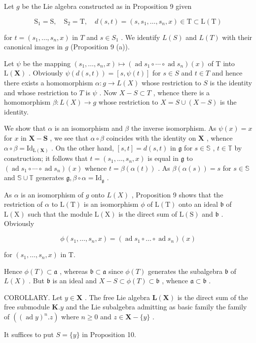 Let \(g\) be the Lie algebra constructed as in Proposition 9 given

\[
\mathrm{S} _ {1} = \mathrm{S}, \quad \mathrm{S} _ {2} = \mathrm{T}, \quad d (s, t) = (s, s _ {1}, \dots , s _ {n}, x) \in \mathrm{T} \subset \mathrm{L} (\mathrm{T})
\]

for \(t = (s_1, \ldots, s_n, x)\) in \(T\) and \(s \in S_1\) . We identify \(L(S)\) and \(L(T)\) with their canonical images in \(g\) (Proposition 9 (a)).

Let \(\psi\) be the mapping \((s_1, \ldots, s_n, x) \mapsto (\operatorname{ad} s_1 \circ \cdots \circ \operatorname{ad} s_n)(x)\) of T into \(\mathrm{L}(\mathbf{X})\) . Obviously \(\psi(d(s, t)) = [s, \psi(t)]\) for \(s \in S\) and \(t \in T\) and hence there exists a homomorphism \(\alpha: g \to L(X)\) whose restriction to \(S\) is the identity and whose restriction to \(T\) is \(\psi\) . Now \(X - S \subset T\) , whence there is a homomorphism \(\beta: L(X) \to g\) whose restriction to \(X = S \cup (X - S)\) is the identity.

We show that \(\alpha\) is an isomorphism and \(\beta\) the inverse isomorphism. As \(\psi(x) = x\) for \(x\) in \(\mathbf{X} - \mathbf{S}\) , we see that \(\alpha \circ \beta\) coincides with the identity on \(\mathbf{X}\) , whence \(\alpha \circ \beta = \mathrm{Id}_{\mathrm{L}(\mathbf{X})}\) . On the other hand, \([s, t] = d(s, t)\) in \(\mathfrak{g}\) for \(s \in \mathbb{S}\) , \(t \in \mathbb{T}\) by construction; it follows that \(t = (s_1, \ldots, s_n, x)\) is equal in \(\mathfrak{g}\) to \((\operatorname{ad} s_1 \circ \cdots \circ \operatorname{ad} s_n)(x)\) whence \(t = \beta(\alpha(t))\) . As \(\beta(\alpha(s)) = s\) for \(s \in \mathbb{S}\) and \(\mathbb{S} \cup \mathbb{T}\) generates \(\mathfrak{g}, \beta \circ \alpha = \mathrm{Id}_{\mathfrak{g}}\) .

As \(\alpha\) is an isomorphism of \(g\) onto \(L(X)\) , Proposition 9 shows that the restriction of \(\alpha\) to \(\mathrm{L(T)}\) is an isomorphism \(\phi\) of \(\mathrm{L(T)}\) onto an ideal \(\mathfrak{b}\) of \(\mathrm{L(X)}\) such that the module \(\mathrm{L(X)}\) is the direct sum of \(\mathrm{L(S)}\) and \(\mathfrak{b}\) . Obviously

\[
\phi (s _ {1}, \dots , s _ {n}, x) = (\operatorname{ad} s _ {1} \circ \dots \circ \operatorname{ad} s _ {n}) (x)
\]

for \((s_1, \ldots, s_n, x)\) in T.

Hence \(\phi(T) \subset \mathfrak{a}\) , whereas \(\mathfrak{b} \subset \mathfrak{a}\) since \(\phi(T)\) generates the subalgebra \(\mathfrak{b}\) of \(L(X)\) . But \(\mathfrak{b}\) is an ideal and \(X - S \subset \phi(T) \subset \mathfrak{b}\) , whence \(\mathfrak{a} \subset \mathfrak{b}\) .

COROLLARY. Let \(y \in \mathbf{X}\) . The free Lie algebra \(\mathbf{L}(\mathbf{X})\) is the direct sum of the free submodule \(\mathbf{K}.y\) and the Lie subalgebra admitting as basic family the family of \(((\operatorname{ad}y)^n.z)\) where \(n \geqslant 0\) and \(z \in \mathbf{X} - \{y\}\) .

It suffices to put \(S = \{y\}\) in Proposition 10.

